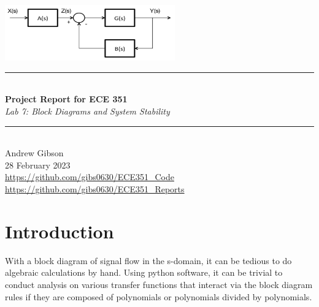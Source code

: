 \documentclass[12pt,a4paper]{article}
\newcommand{\HRule}{\rule{\linewidth}{0.5mm}}
\begin{document}
\begin{titlepage}
\begin{center}
\includegraphics[width=0.55\textwidth]{titlepage_image.png}~\\[2cm]
\HRule \\[0.4cm]
{ \LARGE 
  \textbf{Project Report for ECE 351}\\[0.4cm]
  \emph{Lab 7: Block Diagrams and System Stability}\\[0.4cm]
}
\HRule \\[1.5cm]
{ \large
  Andrew Gibson \\[0.1cm]
 28 February 2023\\[0.1cm]
  \url{https://github.com/gibs0630/ECE351\_Code}\\[0.1cm]
  \url{https://github.com/gibs0630/ECE351\_Reports}\\[0.1cm]
}
\vfill
{\large }
 
\end{center}
\end{titlepage}
\newpage
\tableofcontents
{}
\newpage
\setcounter{page}{1}
\section{Introduction}\label{sec:intro}
With a block diagram of signal flow in the s-domain, it can be tedious to do algebraic calculations by hand.  Using python software, it can be trivial to conduct analysis  on various transfer functions that interact via the block diagram rules if they are composed of polynomials or polynomials divided by polynomials. 
\end{document}
